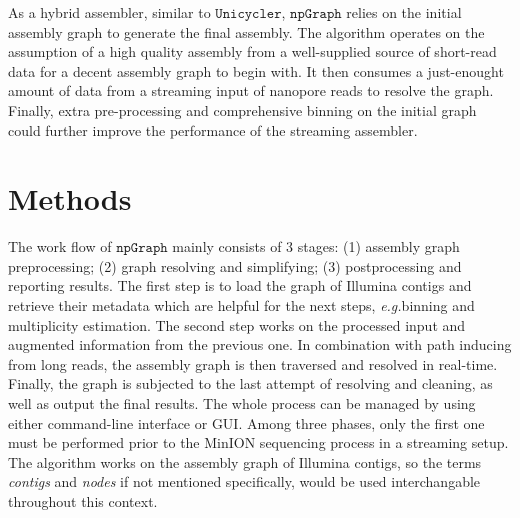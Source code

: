 \documentclass[10pt,twocolumn,twoside]{genpaper}
\newcommand{\npgraph}{$\mathtt{npGraph}$}
\newcommand{\unicycler}{$\mathtt{Unicycler}$}
\newcommand{\EG}{\emph{e.g.}}
\begin{document}

As a hybrid assembler, similar to \unicycler{}, \npgraph{} relies on the initial assembly graph to generate the final assembly. The algorithm operates on the assumption of a high quality assembly from a well-supplied source of short-read data for a decent assembly graph to begin with.
It then consumes a just-enought amount of data from a streaming input of nanopore reads to resolve the graph. 
Finally, extra pre-processing and comprehensive binning on the initial graph could further improve the performance of the streaming assembler.


\section*{Methods}

The work flow of \npgraph{} mainly consists of 3 stages: (1) assembly graph preprocessing; (2) graph resolving and simplifying; (3) postprocessing and reporting results. 
The first step is to load the graph of Illumina contigs and retrieve their metadata which are helpful for the next steps, \EG binning and multiplicity estimation.
The second step works on the processed input and augmented information from the previous one. In combination with path inducing from long reads, the assembly graph is then traversed and resolved in real-time.
Finally, the graph is subjected to the last attempt of resolving and cleaning, as well as output the final results. The whole process can be managed by using either command-line interface or GUI.
Among three phases, only the first one must be performed prior to the MinION sequencing process in a streaming setup.
The algorithm works on the assembly graph of Illumina contigs, so the terms \emph{contigs} and \emph{nodes} if not mentioned specifically, would be used interchangable throughout this context.
\end{document}
